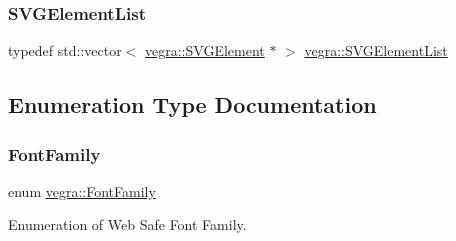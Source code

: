 \subsubsection{\texorpdfstring{S\+V\+G\+Element\+List}{SVGElementList}}
{\footnotesize\ttfamily typedef std\+::vector$<$ \mbox{\hyperlink{structvegra_1_1SVGElement}{vegra\+::\+S\+V\+G\+Element}} $\ast$ $>$ \mbox{\hyperlink{namespacevegra_a2722f5eceb74f65746a02a57b71d125e}{vegra\+::\+S\+V\+G\+Element\+List}}}



\subsection{Enumeration Type Documentation}
\mbox{\label{namespacevegra_a342c4e8c946c4f729d694257d1ed876b}} 
\subsubsection{\texorpdfstring{Font\+Family}{FontFamily}}
{\footnotesize\ttfamily enum \mbox{\hyperlink{namespacevegra_a342c4e8c946c4f729d694257d1ed876b}{vegra\+::\+Font\+Family}}\hspace{0.3cm}{\ttfamily [strong]}}



Enumeration of Web Safe Font Family. 

